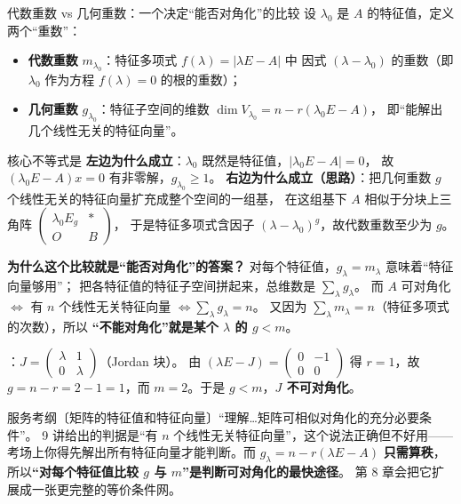 \begin{fdeep}{代数重数 vs 几何重数：一个决定“能否对角化”的比较}
设 $\lambda_0$ 是 $A$ 的特征值，定义两个“重数”：
\begin{itemize}[leftmargin=2.2em,itemsep=0.22em]
\item \textbf{代数重数} $m_{\lambda_0}$：特征多项式 $f(\lambda)=\lvert\lambda E-A\rvert$ 中
      因式 $(\lambda-\lambda_0)$ 的重数（即 $\lambda_0$ 作为方程 $f(\lambda)=0$ 的根的重数）；
\item \textbf{几何重数} $g_{\lambda_0}$：特征子空间的维数 $\dim V_{\lambda_0}=n-r(\lambda_0 E-A)$，
      即“能解出几个线性无关的特征向量”。
\end{itemize}
核心不等式是
\textbf{左边为什么成立}：$\lambda_0$ 既然是特征值，$\lvert\lambda_0 E-A\rvert=0$，
故 $(\lambda_0 E-A)x=0$ 有非零解，$g_{\lambda_0}\ge1$。
\textbf{右边为什么成立（思路）}：把几何重数 $g$ 个线性无关的特征向量扩充成整个空间的一组基，
在这组基下 $A$ 相似于分块上三角阵 $\begin{pmatrix}\lambda_0 E_g&\ast\\ O&B\end{pmatrix}$，
于是特征多项式含因子 $(\lambda-\lambda_0)^{g}$，故代数重数至少为 $g$。

\medskip
\textbf{为什么这个比较就是“能否对角化”的答案？}
对每个特征值，$g_{\lambda}=m_{\lambda}$ 意味着“特征向量够用”；
把各特征值的特征子空间拼起来，总维数是 $\sum_{\lambda}g_{\lambda}$。
而 $A$ 可对角化 $\iff$ 有 $n$ 个线性无关特征向量 $\iff\sum_{\lambda}g_{\lambda}=n$。
又因为 $\sum_{\lambda}m_{\lambda}=n$（特征多项式的次数），所以
\textbf{“不能对角化”就是某个 $\lambda$ 的 $g<m$}。

：$J=\begin{pmatrix}\lambda&1\\0&\lambda\end{pmatrix}$（Jordan 块）。
由 $(\lambda E-J)=\begin{pmatrix}0&-1\\0&0\end{pmatrix}$ 得 $r=1$，故
$g=n-r=2-1=1$，而 $m=2$。于是 $g<m$，\textbf{$J$ 不可对角化}。

\fbref{}服务考纲〔矩阵的特征值和特征向量〕“理解…矩阵可相似对角化的充分必要条件”。
9 讲给出的判据是“有 $n$ 个线性无关特征向量”，这个说法正确但不好用——
考场上你得先解出所有特征向量才能判断。而 $g_{\lambda}=n-r(\lambda E-A)$ \textbf{只需算秩}，
所以\textbf{“对每个特征值比较 $g$ 与 $m$”是判断可对角化的最快途径}。
第 8 章会把它扩展成一张更完整的等价条件网。
\end{fdeep}

